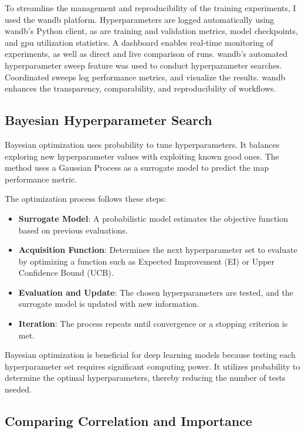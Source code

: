 To streamline the management and reproducibility of the training experiments, I used the \acrlong{wandb} platform. Hyperparameters are logged automatically using \acrshort{wandb}'s Python client, as are training and validation metrics, model checkpoints, and \acrshort{gpu} utilization statistics. A dashboard enables real-time monitoring of experiments, as well as direct and live comparison of runs. \acrshort{wandb}'s automated hyperparameter sweep feature was used to conduct hyperparameter searches. Coordinated sweeps log performance metrics, and visualize the results. \acrshort{wandb} enhances the transparency, comparability, and reproducibility of workflows. 

\subsection{Bayesian Hyperparameter Search}

Bayesian optimization uses probability to tune hyperparameters. It balances exploring new hyperparameter values with exploiting known good ones. The method uses a Gaussian Process as a surrogate model to predict the \acrlong{map} performance metric.


The optimization process follows these steps:
\begin{itemize}
    \item \textbf{Surrogate Model}: A probabilistic model estimates the objective function based on previous evaluations.
    \item \textbf{Acquisition Function}: Determines the next hyperparameter set to evaluate by optimizing a function such as Expected Improvement (EI) or Upper Confidence Bound (UCB).
    \item \textbf{Evaluation and Update}: The chosen hyperparameters are tested, and the surrogate model is updated with new information.
    \item \textbf{Iteration}: The process repeats until convergence or a stopping criterion is met.
\end{itemize}

Bayesian optimization is beneficial for deep learning models because testing each hyperparameter set requires significant computing power. It utilizes probability to determine the optimal hyperparameters, thereby reducing the number of tests needed.


\subsection{Comparing Correlation and Importance}

